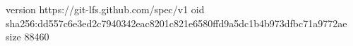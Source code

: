 version https://git-lfs.github.com/spec/v1
oid sha256:dd557c6e3ed2c7940342eac8201c821e6580ffd9a5dc1b4b973dfbc71a9772ae
size 88460
